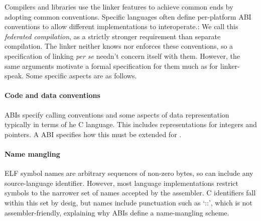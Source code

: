 Compilers and libraries use the linker features to achieve common ends
by adopting common conventions.
Specific languages often define per-platform ABI conventions to
allow different implementations to interoperate.:
We call this \emph{federated compilation}, as a strictly stronger 
requirement than separate compilation.
The linker neither knows nor enforces these conventions, so 
a specification of linking \textit{per se} needn't concern itself with them.
However, the same arguments motivate a formal specification for them much as for linker-speak.
Some specific aspects are as follows.

\paragraph{Code and data conventions}
ABIs specify calling conventions and some aspects of data representation 
typically in terms of he C language.
This includes representations for integers and pointers.
A \Cplusplus{} ABI specifies how this must be extended for \Cplusplus{}.

\paragraph{Name mangling}
ELF symbol names are arbitrary sequences of non-zero bytes, so can include 
any source-language identifier. However, 
most language implementations restrict symbols
to the narrower set of names accepted by the assembler.
C identifiers fall within this set by desig, but 
\Cplusplus{} names include punctuation such as `\textsf{::}', 
which is not assembler-friendly,
explaining why \Cplusplus{} ABIs define a name-mangling scheme.

